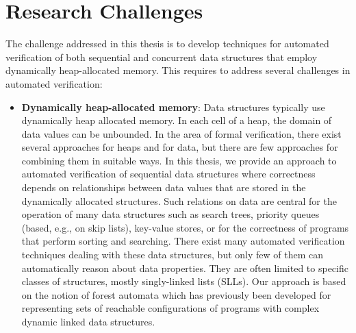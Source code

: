 \section{Research Challenges}
The challenge addressed in this thesis is to develop techniques for automated verification of both sequential and concurrent data structures that employ dynamically heap-allocated memory. This requires to address several challenges in automated verification:
\begin{itemize}
\item {\bf Dynamically heap-allocated memory}: Data structures typically use dynamically heap allocated memory. In each cell of a heap, the domain of data values can be unbounded.
   In the area of formal verification, there exist several approaches for heaps and for data, but there are few approaches for combining them in suitable ways. In this thesis, we provide an approach to automated verification of sequential data structures where correctness depends on relationships between data values that are stored in the dynamically allocated structures. Such relations on data are central for the operation of many data structures such as search trees, priority queues (based, e.g., on skip lists), key-value stores, or for the correctness of programs that perform sorting and searching. 
 There exist many automated verification techniques dealing with these data structures, but only few of them can automatically reason about data properties. They are often limited to specific classes of structures, mostly singly-linked lists (SLLs). Our approach is based on the notion of forest automata which has previously been developed for representing sets of reachable configurations of programs with complex dynamic linked data structures.


\end{itemize}
